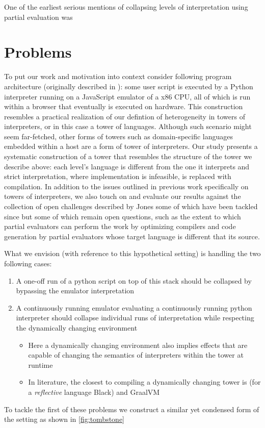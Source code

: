 \documentclass{article}
\theoremstyle{definition}
\begin{document}
One of the earliest serious mentions of collapsing levels of interpretation using partial evaluation was \cite{sturdy1993lisp}

\section{Problems}
To put our work and motivation into context consider following program architecture (originally described in \cite{amin2017collapsing}): some user script is executed by a Python interpreter running on a JavaScript emulator of a x86 CPU, all of which is run within a browser that eventually is executed on hardware. This construction resembles a practical realization of our defintion of heterogeneity in towers of interpreters, or in this case a tower of languages. Although such scenario might seem far-fetched, other forms of towers such as domain-specific languages embedded within a host are a form of tower of interpreters. Our study presents a systematic construction of a tower that resembles the structure of the tower we describe above: each level's language is different from the one it interprets and strict interpretation, where implementation is infeasible, is replaced with compilation. In addition to the issues outlined in previous work specifically on towers of interpreters, we also touch on and evaluate our results against the collection of open challenges described by Jones \cite{jones1988challenging} some of which have been tackled since but some of which remain open questions, such as the extent to which partial evaluators can perform the work by optimizing compilers and code generation by partial evaluators whose target language is different that its source. %

What we envision (with reference to this hypothetical setting) is handling the two following cases:
\begin{enumerate}
	\item A one-off run of a python script on top of this stack should be collapsed by bypassing the emulator interpretation
	\item A continuously running emulator evaluating a continuously running python interpreter should collapse individual runs of interpretation while respecting the dynamically changing environment
	\begin{itemize}
		\item Here a dynamically changing environment also implies effects that are capable of changing the semantics of interpreters within the tower at runtime
		\item In literature, the closest to compiling a dynamically changing tower is \cite{asai1997partial, amin2017collapsing} (for a \textit{reflective} language Black) and GraalVM \cite{wurthinger2013one}
	\end{itemize}
\end{enumerate}
To tackle the first of these problems we construct a similar yet condensed form of the setting as shown in \ref{fig:tombstone}
\end{document}

